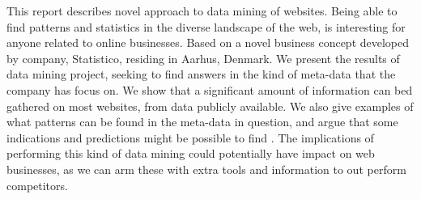 This report describes novel approach to data mining of websites. Being able to find patterns and statistics in the diverse landscape of the web, is interesting for anyone related to online businesses. Based on a novel business concept developed by company, Statistico, residing in Aarhus, Denmark. We present the results of data mining project, seeking to find answers in the kind of meta-data that the company has focus on. We show that a significant amount of information can bed gathered on most websites, from data publicly available. We also give examples of what patterns can be found in the meta-data in question, and argue that some indications and predictions might be possible to find . The implications of performing this kind of data mining could potentially have impact on web businesses, as we can arm these with extra tools and information to out perform competitors.